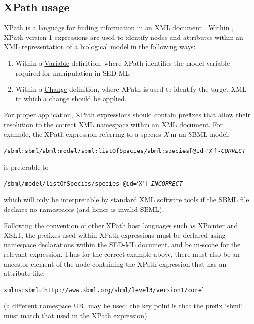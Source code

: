 \subsection{XPath usage}  

\label{sec:xpath} 
XPath is a language for finding information in an XML document \citep{xpath:1999}. Within \currentLV, XPath version 1 expressions are  used to identify nodes and attributes within an XML representation of a biological model in the following ways:
%
\begin{enumerate}
\item {Within a \hyperref[class:variable]{Variable} definition, where XPath identifies the model variable required for manipulation in SED-ML.}
\item {Within a  \hyperref[class:change]{Change} definition, where XPath is used to identify the target XML to which a change should be applied.} 

\end{enumerate}

For proper application, XPath expressions should contain prefixes that allow their resolution to the correct XML namespace within an XML document. For example, the XPath expression referring to a species \emph{X} in an SBML model:
\begin{alltt}
/sbml:sbml/sbml:model/sbml:listOfSpecies/sbml:species[@id=`X'] {\color{green} \tickYes -\emph{CORRECT}}
\end{alltt}
is preferable to 
\begin{alltt}
/sbml/model/listOfSpecies/species[@id=`X'] {\color{red} \tickNo -\emph{INCORRECT} }
\end{alltt}

which will only be interpretable by standard XML software tools if the SBML file declares no namespaces (and hence is invalid SBML).

Following the convention of other XPath host languages such as XPointer and XSLT, the prefixes used within XPath expressions must be declared using namespace declarations within the SED-ML document, and be in-scope for the relevant expression.
Thus for the correct example above, there must also be an ancestor element of the node containing the XPath expression that has an attribute like:
\begin{alltt}
xmlns:sbml=`http://www.sbml.org/sbml/level3/version1/core'
\end{alltt}
(a different namespace URI may be used; the key point is that the prefix `sbml' must match that used in the XPath expression).



